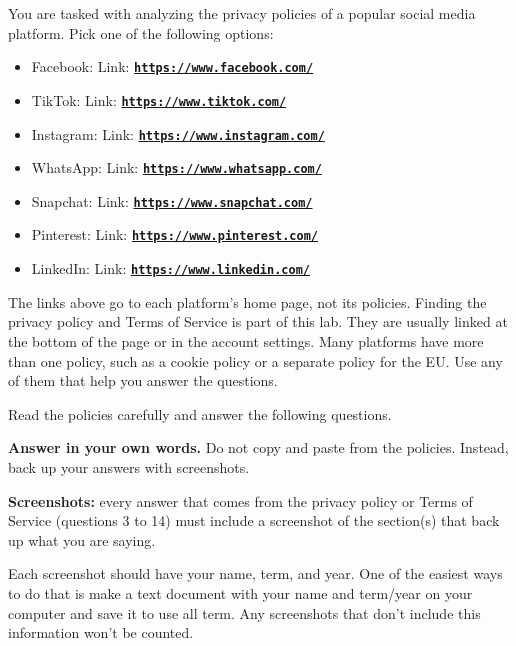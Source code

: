 \documentclass[12pt]{article}
\begin{document}
You are tasked with analyzing the privacy policies of a popular social media platform.  Pick one of the following options: 
        \begin{itemize}
            \item Facebook: Link: \href{https://www.facebook.com/}{\textbf{\nolinkurl{https://www.facebook.com/}}}
            \item TikTok: Link: \href{https://www.tiktok.com/}{\textbf{\nolinkurl{https://www.tiktok.com/}}}
            \item Instagram: Link: \href{https://www.instagram.com/}{\textbf{\nolinkurl{https://www.instagram.com/}}}
            \item WhatsApp: Link: \href{https://www.whatsapp.com/}{\textbf{\nolinkurl{https://www.whatsapp.com/}}}
            \item Snapchat: Link: \href{https://www.snapchat.com/}{\textbf{\nolinkurl{https://www.snapchat.com/}}}
            \item Pinterest: Link: \href{https://www.pinterest.com/}{\textbf{\nolinkurl{https://www.pinterest.com/}}}
            \item LinkedIn: Link: \href{https://www.linkedin.com/}{\textbf{\nolinkurl{https://www.linkedin.com/}}}
    \end{itemize}
        
        

The links above go to each platform's home page, not its policies. Finding the privacy policy and Terms of Service is part of this lab. They are usually linked at the bottom of the page or in the account settings. Many platforms have more than one policy, such as a cookie policy or a separate policy for the EU. Use any of them that help you answer the questions.

Read the policies carefully and answer the following questions.

\textbf{Answer in your own words.} Do not copy and paste from the policies. Instead, back up your answers with screenshots.

\textbf{Screenshots:} every answer that comes from the privacy policy or Terms of Service (questions 3 to 14) must include a screenshot of the section(s) that back up what you are saying.

Each screenshot should have your name, term, and year.  One of the easiest ways to do that is make a text document with your name and term/year on your computer and save it to use all term. Any screenshots that don't include this information won't be counted.
\end{document}
